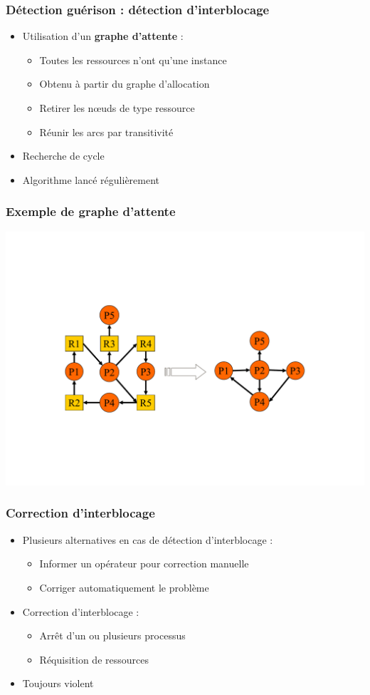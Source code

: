 \begin{frame}
\frametitle{Détection guérison : détection d’interblocage}
\begin{itemize}
\item Utilisation d’un \textbf{graphe d’attente} :
\begin{itemize}
\item Toutes les ressources n’ont qu’une instance
\item Obtenu à partir du graphe d’allocation
\item Retirer les nœuds de type ressource
\item Réunir les arcs par transitivité
\end{itemize}
\item Recherche de cycle
\item Algorithme lancé régulièrement
\end{itemize}
\end{frame}

\begin{frame}
\frametitle{Exemple de graphe d’attente}
\includegraphics[width=.9\textwidth]{../illustration/gar2ga.pdf}
\end{frame}

\begin{frame}
\frametitle{Correction d’interblocage}
\begin{itemize}
\item Plusieurs alternatives en cas de détection d’interblocage :
\begin{itemize}
\item Informer un opérateur pour correction manuelle
\item Corriger automatiquement le problème
\end{itemize}
\item Correction d’interblocage :
\begin{itemize}
\item Arrêt d’un ou plusieurs processus
\item Réquisition de ressources
\end{itemize}
\item Toujours violent
\end{itemize}
\end{frame}

